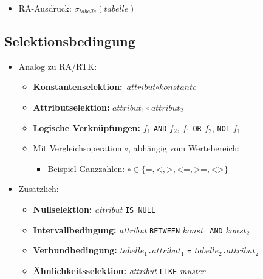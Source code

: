 \documentclass[a4paper, 11pt, accentcolor = tud3b]{tudreport}
\begin{document}
                \begin{itemize}
                	\item RA-Ausdruck: \( \sigma _ \textit{tabelle} (\textit{tabelle}) \)
                \end{itemize}

            \subsection{Selektionsbedingung} %
                \begin{itemize}
                	\item Analog zu RA/RTK:
                		\begin{itemize}
                			\item \textbf{Konstantenselektion:} \( \textit{attribut} \circ \textit{konstante} \)
                			\item \textbf{Attributselektion:} \( \textit{attribut}_1 \circ \textit{attribut}_2 \)
                			\item \textbf{Logische Verknüpfungen:} \(f_1\) \lstinline|AND| \(f_2\), \(f_1\) \lstinline|OR| \(f_2\), \lstinline|NOT| \(f_1\)
                			\item Mit Vergleichsoperation \(\circ\), abhängig vom Wertebereich:
                				\begin{itemize}
                					\item Beispiel Ganzzahlen: \( \circ \in \{ \texttt{=}, \texttt{<}, \texttt{>}, \texttt{<=}, \texttt{>=}, \texttt{<>} \} \)
                				\end{itemize}
                		\end{itemize}
               		\item Zusätzlich:
               			\begin{itemize}
               				\item \textbf{Nullselektion:} \textit{attribut} \lstinline|IS NULL|
               				\item \textbf{Intervallbedingung:} \textit{attribut} \lstinline|BETWEEN| \(\textit{konst}_1\) \lstinline|AND| \(\textit{konst}_2\)
               				\item \textbf{Verbundbedingung:} \(\textit{tabelle}_1\)\lstinline|.|\(\textit{attribut}_1\) \lstinline|=| \(\textit{tabelle}_2\)\lstinline|.|\(\textit{attribut}_2\)
               				\item \textbf{Ähnlichkeitsselektion:} \textit{attribut} \lstinline|LIKE| \textit{muster}
               			\end{itemize}
                \end{itemize}
\end{document}
